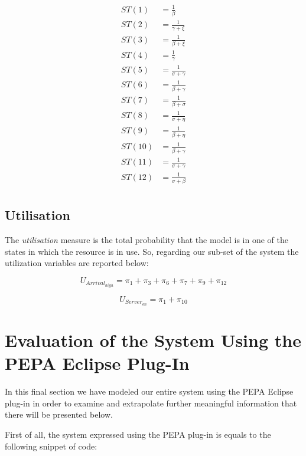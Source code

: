 \documentclass{article}
\begin{document}
\begin{align*}
    ST(1) &= \frac{1}{\beta} \\
    ST(2) &= \frac{1}{\gamma + \xi} \\
    ST(3) &= \frac{1}{\beta + \xi} \\
    ST(4) &= \frac{1}{\gamma} \\
    ST(5) &= \frac{1}{\sigma + \gamma} \\
    ST(6) &= \frac{1}{\beta + \gamma} \\
    ST(7) &= \frac{1}{\beta + \sigma} \\
    ST(8) &= \frac{1}{\sigma + \eta} \\
    ST(9) &= \frac{1}{\beta + \eta} \\
    ST(10) &= \frac{1}{\beta + \gamma} \\
    ST(11) &= \frac{1}{\sigma + \gamma} \\
    ST(12) &= \frac{1}{\sigma + \beta} \\
\end{align*}

\subsection{Utilisation}

The \textit{utilisation} measure is the total probability that the model is in one of the states in which the resource is in use.\newline
\noindent So, regarding our sub-set of the system the utilization variables are reported below:

\[U_{Arrival_{high}} = \pi_{1} + \pi_{3} + \pi_{6} + \pi_{7} + \pi_{9} + \pi_{12}\]

\[U_{Server_{on}} = \pi_{1} + \pi_{10}\]

\section{Evaluation of the System Using the PEPA Eclipse Plug-In}
In this final section we have modeled our entire system using the PEPA Eclipse plug-in in order to examine and extrapolate further meaningful information that there will be presented below.\newline

\par\noindent First of all, the system expressed using the PEPA plug-in is equals to the following snippet of code:
\end{document}
